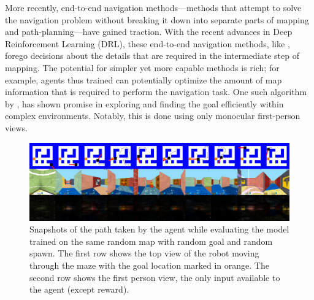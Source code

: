 More recently, end-to-end navigation methods---methods that attempt to  
solve the navigation problem without breaking it down into separate parts of mapping and path-planning---have gained traction.
%
With the recent advances in Deep Reinforcement Learning (DRL), these end-to-end navigation methods, like \cite{MnBaMiICML2016,SiHuMaNATURE2016,LePaKrISER2017,MiPaViICLR2017,OhChSiICML2016}, forego decisions about the details that are required in the intermediate step of mapping.
The potential for simpler yet more capable methods is rich; for example, agents thus trained can potentially optimize the amount of map information that is required to perform the navigation task.
One such algorithm by \cite{MiPaViICLR2017}, has shown promise in exploring and finding the goal efficiently within complex environments. Notably, this is done using only monocular first-person views.

\begin{figure}
\includegraphics[width=\textwidth,trim=0 336pt 0 0,clip]{./exp-results/training-09x09-0127-on-0127.png}%
\caption{
Snapshots of the path taken by the agent while evaluating the model trained on the same random map with random goal and random spawn.
The first row shows the top view of the robot moving through the maze with the goal location marked in orange. The second row shows the first person view, the only input available to the agent (except reward).}
\label{fig:training-qualitative}
\end{figure}

